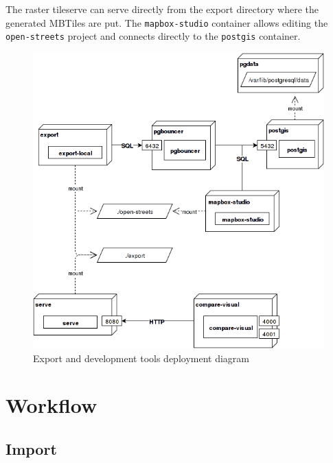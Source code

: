 The raster tileserve can serve directly from the export directory where the generated MBTiles
are put. The \texttt{mapbox-studio} container allows editing the \texttt{open-streets} project and connects directly to the \texttt{postgis} container.

\begin{figure}[h]
  \includegraphics[scale=0.6]{images/deployment_dev_export.png}
  \caption{Export and development tools deployment diagram}
\end{figure}

\newpage
\section{Workflow}\label{workflow}

\subsection{Import}\label{workflow-import}

